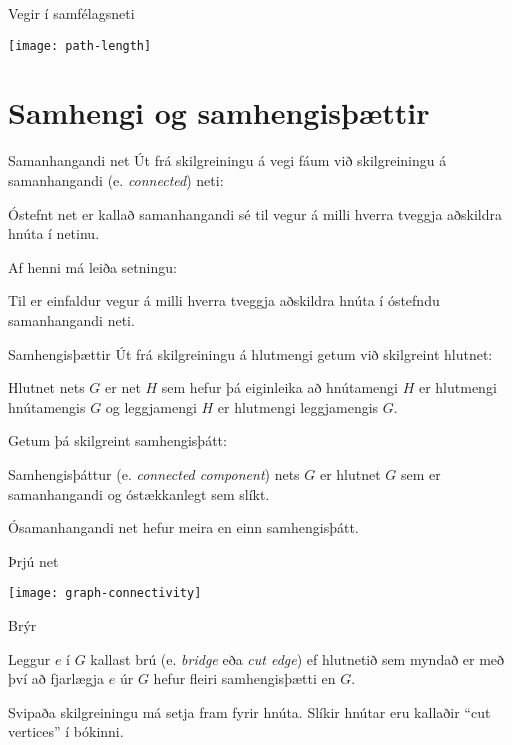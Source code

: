 \documentclass{beamer}
\begin{document}
\begin{frame}{Vegir í samfélagsneti}
\begin{center}
\texttt{[image: path-length]}
\end{center}
\end{frame}

\section{Samhengi og samhengisþættir}

\begin{frame}{Samanhangandi net}
Út frá skilgreiningu á vegi fáum við skilgreiningu á samanhangandi (e. \emph{connected}) neti:
\begin{tcolorbox}[title=Samanhangandi net]
Óstefnt net er kallað samanhangandi sé til vegur á milli hverra tveggja aðskildra hnúta í netinu.
\end{tcolorbox}
Af henni má leiða setningu:
\begin{tcolorbox}
Til er einfaldur vegur á milli hverra tveggja aðskildra hnúta í óstefndu samanhangandi neti.
\end{tcolorbox}

\end{frame}

\begin{frame}{Samhengisþættir}
Út frá skilgreiningu á hlutmengi getum við skilgreint hlutnet:
\begin{tcolorbox}[title=Hlutnet]
Hlutnet nets $G$ er net $H$ sem hefur þá eiginleika að hnútamengi $H$ er hlutmengi hnútamengis $G$ og leggjamengi $H$ er hlutmengi leggjamengis $G$.
\end{tcolorbox}
\pause
Getum þá skilgreint samhengisþátt:
\begin{tcolorbox}
Samhengisþáttur (e. \emph{connected component}) nets $G$ er hlutnet $G$ sem er samanhangandi og óstækkanlegt sem slíkt.
\end{tcolorbox}
Ósamanhangandi net hefur meira en einn samhengisþátt.
\end{frame}

\begin{frame}{Þrjú net}
\begin{center}
\texttt{[image: graph-connectivity]}
\end{center}
\end{frame}

\begin{frame}{Brýr}
\begin{tcolorbox}[title=Brú]
Leggur $e$ í $G$ kallast brú (e. \emph{bridge} eða \emph{cut edge}) ef hlutnetið sem myndað er með því að fjarlægja $e$ úr $G$ hefur fleiri samhengisþætti en $G$.
\end{tcolorbox}
Svipaða skilgreiningu má setja fram fyrir hnúta. Slíkir hnútar eru kallaðir ``cut vertices'' í bókinni.
\end{frame}
\end{document}
